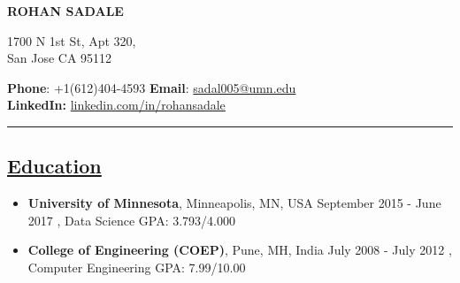\documentclass[10pt]{article}
\begin{document}

 

\begin{center}
\bfseries {\huge {\selectfont ROHAN SADALE}}
\end{center}

\vspace{14pt}

\noindent \begin{minipage}[b]{0.3\hsize}
\normalsize 1700 N 1st St, Apt 320, \\
\normalsize San Jose CA 95112
\end{minipage}
\hfill
\begin{minipage}[b]{0.50 \hsize}
{\bfseries {\normalsize Phone}}: {\normalsize {+1(612)404-4593}} \hspace{0.15in} {\bfseries {\normalsize Email}}: {\normalsize \url{sadal005@umn.edu}} \\
{\bfseries {\normalsize LinkedIn:}} \normalsize \url{linkedin.com/in/rohansadale}
\end{minipage}

\vspace{4pt}

\hrule
\vspace{-0.2cm}
\subsection*{\underline{Education}}
\vspace{-0.1cm}
\begin{itemize}[leftmargin=*]
\item[] {\bfseries University of Minnesota}, Minneapolis, MN, USA \hfill September 2015 - June 2017
, Data Science \hspace{0.2in} GPA: 3.793/4.000 
\vspace{-0.1cm}
\item[] {\bfseries College of Engineering (COEP)}, Pune, MH, India \hfill July 2008 - July 2012  
, Computer Engineering	 \hspace{0.2in} GPA: 7.99/10.00
\end{itemize}
\end{document}

